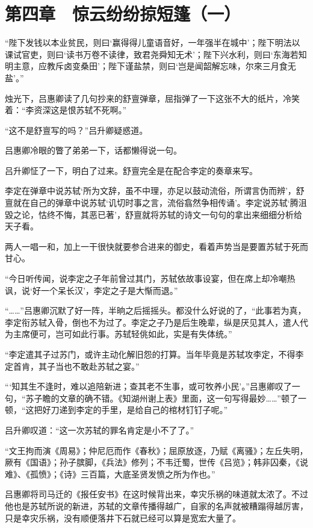 \section{第四章　惊云纷纷掠短篷（一）}

“陛下发钱以本业贫民，则曰‘赢得得儿童语音好，一年强半在城中’；陛下明法以课试官吏，则曰‘读书万卷不读律，致君尧舜知无术’；陛下兴水利，则曰‘东海若知明主意，应教斥卤变桑田’；陛下谨盐禁，则曰‘岂是闻韶解忘味，尔來三月食无盐’。”

烛光下，吕惠卿读了几句抄来的舒亶弹章，屈指弹了一下这张不大的纸片，冷笑着：“李资深这是恨苏轼不死啊。”

“这不是舒亶写的吗？”吕升卿疑惑道。

吕惠卿冷眼的瞥了弟弟一下，话都懒得说一句。

吕升卿怔了一下，明白了过来。舒亶完全是在配合李定的奏章来写。

李定在弹章中说苏轼‘所为文辞，虽不中理，亦足以鼓动流俗，所谓言伪而辨’，舒亶就在自己的弹章中说苏轼‘讥切时事之言，流俗翕然争相传诵’。李定说苏轼‘腾沮毀之论，怙终不悔，其恶已著’，舒亶就将苏轼的诗文一句句的拿出来细细分析给天子看。

两人一唱一和，加上一干很快就要参合进来的御史，看着声势当是要置苏轼于死而甘心。

“今日听传闻，说李定之子年前曾过其门，苏轼依故事设宴，但在席上却冷嘲热讽，说‘好一个呆长汉’，李定之子是大惭而退。”

“……”吕惠卿沉默了好一阵，半晌之后摇摇头。都没什么好说的了，“此事若为真，李定衔苏轼入骨，倒也不为过了。李定之子乃是后生晚辈，纵是厌见其人，遣人代为主席便可，岂可如此行事。苏轼轻佻如此，实是有失体统。”

“李定遣其子过苏门，或许主动化解旧怨的打算。当年毕竟是苏轼攻李定，不得李定首肯，其子当也不敢赴苏轼之宴。”

“‘知其生不逢时，难以追陪新进；查其老不生事，或可牧养小民’。”吕惠卿叹了一句，“苏子瞻的文章的确不错。《知湖州谢上表》里面，这一句写得最妙……”顿了一顿，“这把好刀递到李定的手里，是给自己的棺材钉钉子呢。”

吕升卿叹道：“这一次苏轼的罪名肯定是小不了了。”

“文王拘而演《周易》；仲尼厄而作《春秋》；屈原放逐，乃赋《离骚》；左丘失明，厥有《国语》；孙子膑脚，《兵法》修列；不韦迁蜀，世传《吕览》；韩非囚秦，《说难》、《孤愤》；《诗》三百篇，大底圣贤发愤之所为作也。”

吕惠卿将司马迁的《报任安书》在这时候背出来，幸灾乐祸的味道就太浓了。不过他也是苏轼所说的新进，苏轼的文章传播得越广，自家的名声就被糟蹋得越厉害，只是幸灾乐祸，没有顺便落井下石就已经可以算是宽宏大量了。

